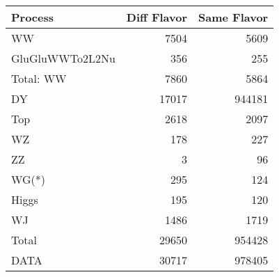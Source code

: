 \begin{table}[ht]
	\centering
\begin{tabular}{lrr}

         Process &  Diff Flavor &  Same Flavor \\
		\hline
              WW &         7504 &         5609 \\
 GluGluWWTo2L2Nu &          356 &          255 \\
\hline
       Total: WW &         7860 &         5864 \\
              DY &        17017 &       944181 \\
             Top &         2618 &         2097 \\
              WZ &          178 &          227 \\
              ZZ &            3 &           96 \\
           WG(*) &          295 &          124 \\
           Higgs &          195 &          120 \\
              WJ &         1486 &         1719 \\
\hline
           Total &        29650 &       954428 \\
            DATA &        30717 &       978405 \\


\end{tabular}

\end{table}